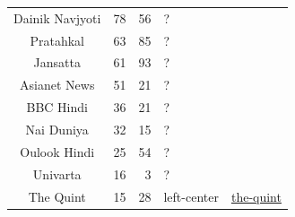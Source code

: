\begin{table}[!htbp]
{\begin{tabular}{c|r|r|P{0.23\textwidth}|c}
            Dainik Navjyoti & 78                  & 56              & ?                                                                                                      &                                                                                                  \\
            Pratahkal       & 63                  & 85              & ?                                                                                                      &                                                                                                  \\
            Jansatta        & 61                  & 93              & ?                                                                                                      &                                                                                                  \\
            Asianet News    & 51                  & 21              & ?                                                                                                      &                                                                                                  \\
            BBC Hindi       & 36                  & 21              & ?                                                                                                      &                                                                                                  \\
            Nai Duniya      & 32                  & 15              & ?                                                                                                      &                                                                                                  \\
            Oulook Hindi    & 25                  & 54              & ?                                                                                                      &                                                                                                  \\
            Univarta        & 16                  & 3               & ?                                                                                                      &                                                                                                  \\
            The Quint       & 15                  & 28              & left-center                                                                                            & \href{https://mediabiasfactcheck.com/the-quint/}{the-quint}                                      \\

\end{tabular}}
\end{table}
